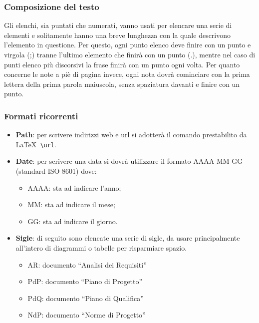 \subsubsection{Composizione del testo}
Gli elenchi, sia puntati che numerati, vanno usati per elencare una serie di elementi e solitamente hanno una breve lunghezza con la quale descrivono l'elemento in questione. Per questo, ogni punto elenco deve finire con un punto e virgola (;) tranne l'ultimo elemento che finirà con un punto (.), mentre nel caso di punti elenco più discorsivi la frase finirà con un punto ogni volta.
\newline
Per quanto concerne le note a piè di pagina invece, ogni nota dovrà cominciare con la prima lettera della prima parola maiuscola, senza spaziatura davanti e finire con un punto.

\subsubsection{Formati ricorrenti}
\begin{itemize}
\item \textbf{Path}: per scrivere indirizzi web e url si adotterà il comando prestabilito da \LaTeX \verb+ \url+.
\item \textbf{Date}: per scrivere una data si dovrà utilizzare il formato AAAA-MM-GG (standard ISO 8601) dove:
\begin{itemize}
\item AAAA: sta ad indicare l'anno;
\item MM: sta ad indicare il mese;
\item GG: sta ad indicare il giorno.
\end{itemize}
\item \textbf{Sigle}: di seguito sono elencate una serie di sigle, da usare principalmente all'intero di diagrammi o tabelle per risparmiare spazio.
\begin{itemize}
\item AR: documento ``Analisi dei Requisiti''
\item PdP: documento ``Piano di Progetto''
\item PdQ: documento ``Piano di Qualifica''
\item NdP: documento ``Norme di Progetto''
\end{itemize}
\end{itemize}

